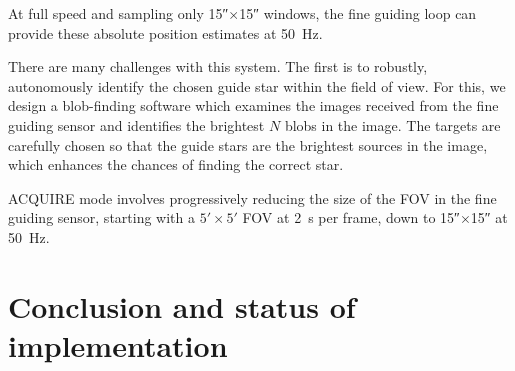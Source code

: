 At full speed and sampling only \ang{;;15}$\times$\ang{;;15} windows, the fine guiding loop can provide these absolute position estimates at \SI{50}{\hertz}. 

There are many challenges with this system. The first is to robustly, autonomously identify the chosen guide star within the field of view. For this, we design a blob-finding software which examines the images received from the fine guiding sensor and identifies the brightest $N$ blobs in the image. The targets are carefully chosen so that the guide stars are the brightest sources in the image, which enhances the chances of finding the correct star. 

ACQUIRE mode involves progressively reducing the size of the FOV in the fine guiding sensor, starting with a $\ang{;5;}\times\ang{;5;}$ FOV at \SI{2}{\second} per frame, down to \ang{;;15}$\times$\ang{;;15} at \SI{50}{\hertz}. 

\section{	Conclusion and status of implementation}